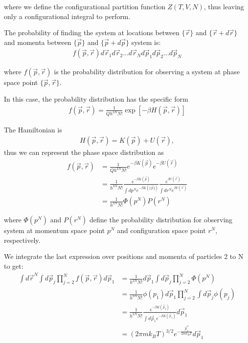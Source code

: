\documentclass[book.tex]{subfiles}
\begin{document}
\noindent where we define the configurational partition function $Z(T,V,N)$, thus leaving only a configurational integral to perform.

The probability of finding the system at locations between $\{\vec{r}\}$ and $\{\vec{r} + d\vec{r}\}$ and momenta between $\{\vec{p}\}$ and $\{\vec{p} + d\vec{p}\}$ system is:
\begin{align}
f(\vec{p},\vec{r})d\vec{r}_1d\vec{r}_2...d\vec{r}_Nd\vec{p}_1d\vec{p}_2...d\vec{p}_N 
\end{align}

\noindent where $f(\vec{p},\vec{r})$ is the probability distribution for observing a system at phase space point $\{\vec{p},\vec{r}\}$.

In this case, the probability distribution has the specific form
\begin{align}
f(\vec{p},\vec{r}) = \frac{1}{Qh^{3N}N!}\exp[-\beta H(\vec{p},\vec{r})] 
\end{align}

The Hamiltonian is 
\begin{align}
H(\vec{p},\vec{r}) = K(\vec{p}) + U(\vec{r}),
\end{align}
thus we can represent the phase space distribution as
\begin{align}
f(\vec{p},\vec{r}) &= \frac{1}{Qh^{3N}N!}e^{-\beta K(\vec{p})}e^{-\beta U(\vec{r})} \\
&= \frac{1}{h^{3N}N!}\frac{e^{-\beta K(\vec{p})}}{\int dp^Ne^{-\beta K(\{ \vec{p}\})}}\frac{e^{\beta U(\vec{r})}}{\int dr^Ne^{\beta U(\vec{r})}} \\
&= \frac{1}{h^{3N}N!}\Phi(p^N)P(r^N)
\end{align}

\noindent where $\Phi(p^N)$ and $P(r^N)$ define the probability distribution for observing system at momentum space point $p^N$ and configuration space point $r^N$, respectively.

We integrate the last expression over positions and momenta of particles 2 to N to get:
\begin{align}
\int d\vec{r}^N \int d\vec{p}_j \prod_{j=2}^N f(\vec{p}, \vec{r})d\vec{p}_1 &= \frac{1}{h^{3N}N!} d\vec{p}_1 \int d\vec{p}_j \prod_{j=2}^N \Phi(p^N) \\ 
&=\frac{1}{h^{3N}N!} \phi(p_1) d\vec{p}_1 \prod_{j=2}^N \int d\vec{p}_j \phi(p_j) \\
&= \frac{1}{h^{3N}N!} \frac{e^{-\beta K(\vec{p}_1)}}{\int d\vec{p}_1 e^{-\beta K( \vec{p}_1)}} d\vec{p}_1 \\
&=(2\pi m k_B T)^{3/2} e^{-\frac{\vec{p}_1^2}{2mk_BT}}d\vec{p}_1
\end{align}
\end{document}
